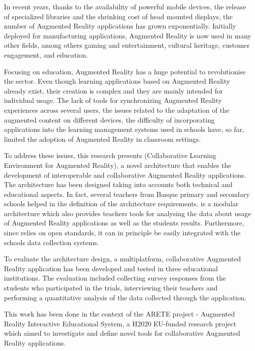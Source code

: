 




\begin{abstracts}        %

In recent years, thanks to the availability of powerful mobile devices, the release of specialized libraries and the shrinking cost of head mounted displays, the number of Augmented Reality applications has grown exponentially. Initially deployed for manufacturing applications, Augmented Reality is now used in many other fields, among others gaming and entertainment, cultural heritage, customer engagement, and education. 

Focusing on education, Augmented Reality has a huge potential to revolutionise the sector. Even though learning applications based on Augmented Reality already exist, their creation is complex and they are mainly intended for individual usage. The lack of tools for synchronizing Augmented Reality experiences across several users, the issues related to the adaptation of the augmented content on different devices, the difficulty of incorporating applications into the learning management systems used in schools have, so far, limited the adoption of Augmented Reality in classroom settings. 

To address these issues, this research presents \arch{} (Collaborative Learning Environment for Augmented Reality), a novel architecture that enables the development of interoperable and collaborative Augmented Reality applications. The architecture has been designed taking into accounts both technical and educational aspects. In fact, several teachers from Basque primary and secondary schools helped in the definition of the architecture requirements. \arch{} is a modular architecture which also provides teachers tools for analysing the data about usage of Augmented Reality applications as well as the students results. Furthermore, since \arch{} relies on open standards, it can in principle be easily integrated with the schools data collection systems.

To evaluate the architecture design, a multiplatform, collaborative Augmented Reality application has been developed and tested in three educational institutions. The evaluation included collecting survey responses from the students who participated in the trials, interviewing their teachers and performing a quantitative analysis of the data collected through the application.

This work has been done in the context of the ARETE project - Augmented Reality Interactive Educational System, a H2020 EU-funded research project which aimed to investigate and define novel tools for collaborative Augmented Reality applications.


\end{abstracts}

